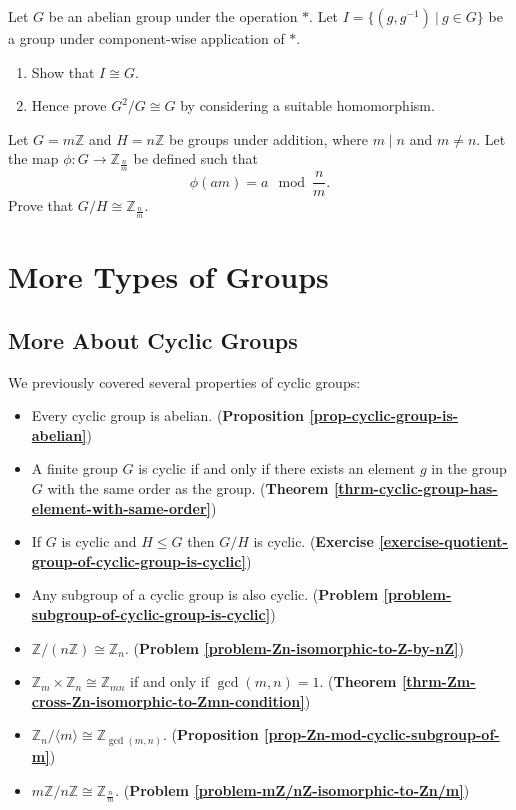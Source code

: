 \begin{problem}\label{problem-cartesian-product-of-group-by-group-isomorphic-to-group}
    Let $G$ be an abelian group under the operation $\ast$. Let $I = \{(g, g^{-1}) \ | \ g \in G\}$ be a group under component-wise application of $\ast$.
    \begin{enumerate}[label=(\roman*)]
        \item Show that $I \cong G$.
        \item Hence prove $G^2/G \cong G$ by considering a suitable homomorphism.
    \end{enumerate}
\end{problem}

\begin{problem}\label{problem-mZ/nZ-isomorphic-to-Zn/m}
    Let $G = m\mathbb{Z}$ and $H = n\mathbb{Z}$ be groups under addition, where $m\;|\;n$ and $m \neq n$. Let the map $\phi: G \to \mathbb{Z}_{\frac nm}$ be defined such that
    \[
        \phi(am) = a \mod \frac{n}{m}.
    \]
    Prove that $G/H \cong \mathbb{Z}_{\frac nm}$.
\end{problem}

\chapter{More Types of Groups}
\section{More About Cyclic Groups}
We previously covered several properties of cyclic groups:
\begin{itemize}
    \item Every cyclic group is abelian. (\textbf{Proposition \ref{prop-cyclic-group-is-abelian}})
    \item A finite group $G$ is cyclic if and only if there exists an element $g$ in the group $G$ with the same order as the group. (\textbf{Theorem \ref{thrm-cyclic-group-has-element-with-same-order}})
    \item If $G$ is cyclic and $H \leq G$ then $G/H$ is cyclic. (\textbf{Exercise \ref{exercise-quotient-group-of-cyclic-group-is-cyclic}})
    \item Any subgroup of a cyclic group is also cyclic. (\textbf{Problem \ref{problem-subgroup-of-cyclic-group-is-cyclic}})
    \item $\mathbb{Z} / (n\mathbb{Z}) \cong \mathbb{Z}_n$. (\textbf{Problem \ref{problem-Zn-isomorphic-to-Z-by-nZ}})
    \item $\mathbb{Z}_m \times \mathbb{Z}_n \cong \mathbb{Z}_{mn}$ if and only if $\gcd(m,n) = 1$. (\textbf{Theorem \ref{thrm-Zm-cross-Zn-isomorphic-to-Zmn-condition}})
    \item $\mathbb{Z}_n / \langle m \rangle \cong \mathbb{Z}_{\gcd(m,n)}$. (\textbf{Proposition \ref{prop-Zn-mod-cyclic-subgroup-of-m}})
    \item $m\mathbb{Z} / n\mathbb{Z} \cong \mathbb{Z}_{\frac nm}$. (\textbf{Problem \ref{problem-mZ/nZ-isomorphic-to-Zn/m}})
\end{itemize}

